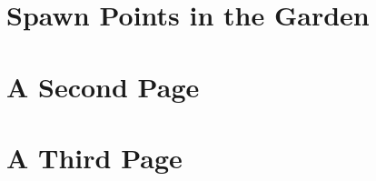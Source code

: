 \documentclass[11pt]{article}
\providecommand\KachoPageOneCmd{}
\providecommand\KachoPageTwoCmd{}
\providecommand\KachoPageThreeCmd{}
\begin{document}
\KachoPageOneCmd
\section{Spawn Points in the Garden}
\lipsum[1-2]
\newpage
\KachoPageTwoCmd
\section{A Second Page}
\lipsum[3-4]
\newpage
\KachoPageThreeCmd
\section{A Third Page}
\lipsum[5-6]
\end{document}
